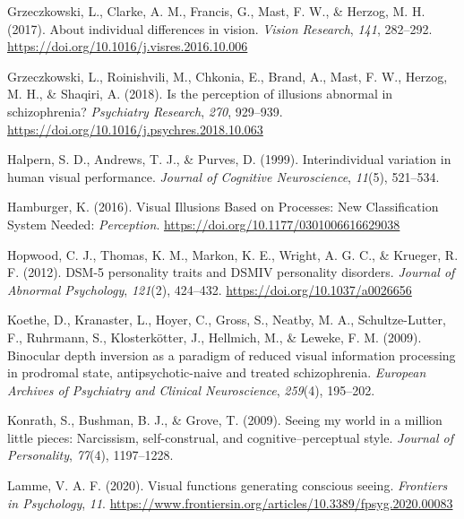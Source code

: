 \documentclass[
  man,floatsintext]{apa6}
\newlength{\cslhangindent}
\newlength{\cslentryspacingunit} %
\newenvironment{CSLReferences}[2] %
 {%
  \setlength{\parindent}{0pt}
  \ifodd #1
  \let\oldpar\par
  \def\par{\hangindent=\cslhangindent\oldpar}
  \fi
  \setlength{\parskip}{#2\cslentryspacingunit}
 }%
 {}
\begin{document}
\begin{CSLReferences}{1}{0}
\leavevmode{}%
Grzeczkowski, L., Clarke, A. M., Francis, G., Mast, F. W., \& Herzog, M. H. (2017). About individual differences in vision. \emph{Vision Research}, \emph{141}, 282--292. \url{https://doi.org/10.1016/j.visres.2016.10.006}

\leavevmode{}%
Grzeczkowski, L., Roinishvili, M., Chkonia, E., Brand, A., Mast, F. W., Herzog, M. H., \& Shaqiri, A. (2018). Is the perception of illusions abnormal in schizophrenia? \emph{Psychiatry Research}, \emph{270}, 929--939. \url{https://doi.org/10.1016/j.psychres.2018.10.063}

\leavevmode{}%
Halpern, S. D., Andrews, T. J., \& Purves, D. (1999). Interindividual variation in human visual performance. \emph{Journal of Cognitive Neuroscience}, \emph{11}(5), 521--534.

\leavevmode{}%
Hamburger, K. (2016). Visual Illusions Based on Processes: New Classification System Needed: \emph{Perception}. \url{https://doi.org/10.1177/0301006616629038}

\leavevmode{}%
Hopwood, C. J., Thomas, K. M., Markon, K. E., Wright, A. G. C., \& Krueger, R. F. (2012). DSM-5 personality traits and DSM{\textendash}IV personality disorders. \emph{Journal of Abnormal Psychology}, \emph{121}(2), 424--432. \url{https://doi.org/10.1037/a0026656}

\leavevmode{}%
Koethe, D., Kranaster, L., Hoyer, C., Gross, S., Neatby, M. A., Schultze-Lutter, F., Ruhrmann, S., Klosterkötter, J., Hellmich, M., \& Leweke, F. M. (2009). Binocular depth inversion as a paradigm of reduced visual information processing in prodromal state, antipsychotic-naive and treated schizophrenia. \emph{European Archives of Psychiatry and Clinical Neuroscience}, \emph{259}(4), 195--202.

\leavevmode{}%
Konrath, S., Bushman, B. J., \& Grove, T. (2009). Seeing my world in a million little pieces: Narcissism, self-construal, and cognitive--perceptual style. \emph{Journal of Personality}, \emph{77}(4), 1197--1228.

\leavevmode{}%
Lamme, V. A. F. (2020). Visual functions generating conscious seeing. \emph{Frontiers in Psychology}, \emph{11}. \url{https://www.frontiersin.org/articles/10.3389/fpsyg.2020.00083}


\end{CSLReferences}
\end{document}

